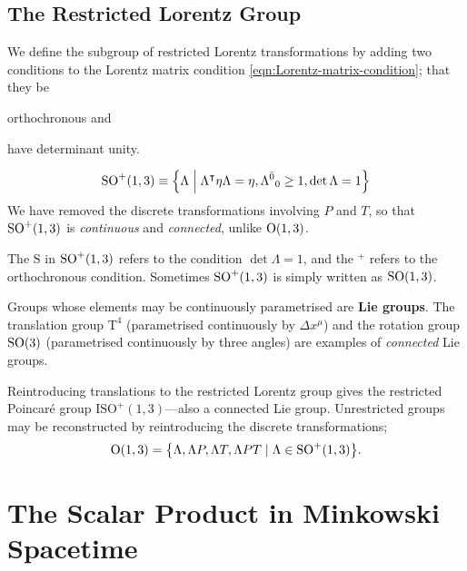 \subsection{The Restricted Lorentz Group}

We define the subgroup of restricted Lorentz transformations by adding two conditions to the Lorentz matrix condition \eqref{eqn:Lorentz-matrix-condition}; that they be
\begin{enumerate*}[label=\arabic*)]
	\item orthochronous and
	\item have determinant unity.
\end{enumerate*}
\begin{align}
	\mathrm{SO}^+(1,3) \equiv \qty{\Lambda \;\middle|\; \Lambda^\intercal\eta\Lambda = \eta,
	\Lambda^{\bar0}{}_0 \ge 1, \det\Lambda = 1}
	\label{eqn:def-restricted-Lorentz-group}
\end{align}
We have removed the discrete transformations involving $ P$ and $ T$, so that $\mathrm{SO}^+(1,3)$ is \emph{continuous} and \emph{connected}, unlike $\mathrm{O}(1,3)$.

\begin{note}[Notation]
	The $\mathrm{S}$ in $\mathrm{SO}^+(1,3)$ refers to the condition $\det\Lambda = 1$, and the $^+$ refers to the orthochronous condition.
	Sometimes $\mathrm{SO}^+(1,3)$ is simply written as $\mathrm{SO}(1,3)$.
\end{note}

Groups whose elements may be continuously parametrised are \textbf{Lie groups}.
The translation group $\mathrm{T}^4$ (parametrised continuously by $\Delta x^\mu$) and the rotation group $\mathrm{SO}(3)$ (parametrised continuously by three angles) are examples of \emph{connected} Lie groups.

Reintroducing translations to the restricted Lorentz group gives the restricted Poincaré group $\mathrm{ISO}^+(1,3)$---also a connected Lie group.
Unrestricted groups may be reconstructed by reintroducing the discrete transformations;
\begin{align}
	\mathrm{O}(1,3) = \qty{\Lambda, \Lambda P, \Lambda T, \Lambda PT \mid \Lambda \in \mathrm{SO}^+(1,3)}
.\end{align}






\section{The Scalar Product in Minkowski Spacetime}






